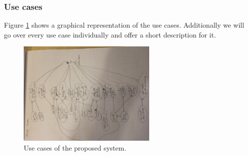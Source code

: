 \documentclass[a4paper, toc=index, 12pt, DIV14, twoside, BCOR2cm, headsepline, numbers=noenddot, bibliography=totoc]{scrbook}
\begin{document}
\subsubsection{Use cases}
Figure \ref{usecase} shows a graphical representation of the use cases. Additionally we will go over every use case individually and offer a short description for it.

\begin{figure}[H]
  \centering
    \includegraphics[width=0.6\textwidth]{images/usecase.jpg}  
  \caption{Use cases of the proposed system.}
  \label{usecase}
\end{figure}
\end{document}
